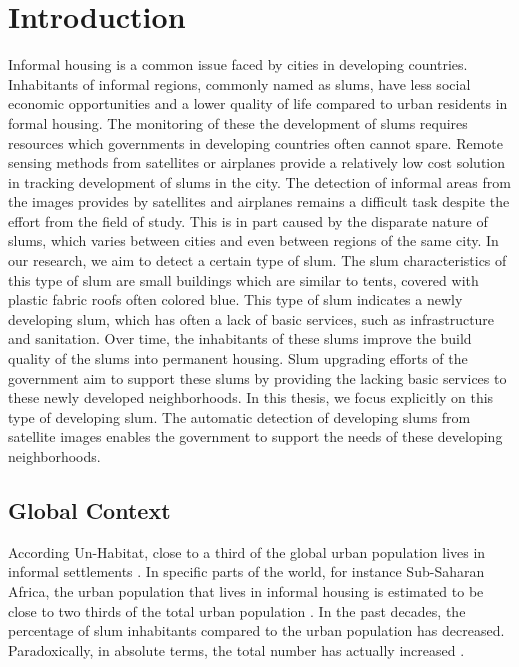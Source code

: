 \section{Introduction}

Informal housing is a common issue faced by cities in developing countries. Inhabitants of informal regions, commonly named as slums, have less social economic opportunities and a lower quality of life compared to urban residents in formal housing. The monitoring of these the development of slums requires resources which governments in developing countries often cannot spare. Remote sensing methods from satellites or airplanes provide a relatively low cost solution in tracking development of slums in the city. The detection of informal areas from the images provides by satellites and airplanes remains a difficult task despite the effort from the field of study. This is in part caused by the disparate nature of slums, which varies between cities and even between regions of the same city. In our research, we aim to detect a certain type of slum. The slum characteristics of this type of slum are small buildings which are similar to tents, covered with plastic fabric roofs often colored blue. This type of slum indicates a newly developing slum, which has often a lack of basic services, such as infrastructure and sanitation. Over time, the inhabitants of these slums improve the build quality of the slums into permanent housing. Slum upgrading efforts of the government aim to support these slums by providing the lacking basic services to these newly developed neighborhoods. In this thesis, we focus explicitly on this type of developing slum. The automatic detection of developing slums from satellite images enables the government to support the needs of these developing neighborhoods.

\subsection{Global Context}
According Un-Habitat, close to a third of the global urban population lives in informal settlements \cite{2016state}. In specific parts of the world, for instance Sub-Saharan Africa, the urban population that lives in informal housing is estimated to be close to two thirds of the total urban population \cite{un2013planning}. In the past decades, the percentage of slum inhabitants compared to the urban population has decreased. Paradoxically, in absolute terms, the total number has actually increased \cite{2016state}.


